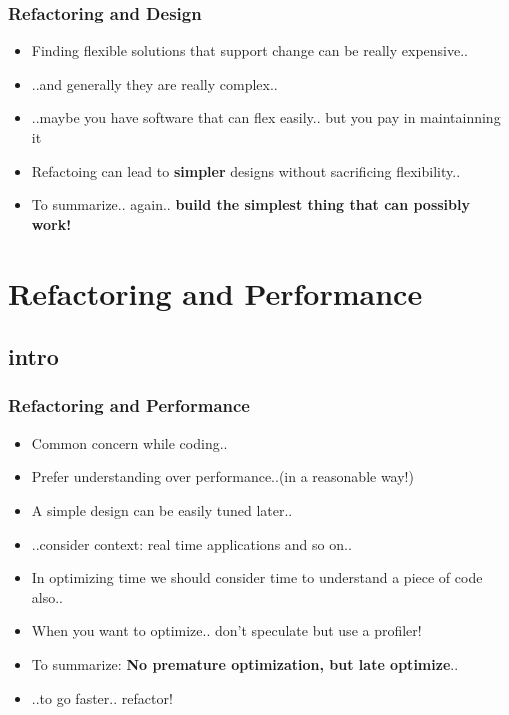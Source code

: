 \documentclass{beamer}
\begin{document}
  \begin{frame}
  \frametitle{Refactoring and Design} 
  \begin{itemize}
  		\item<+-> Finding flexible solutions that support change can be really expensive.. 
  		\item<+-> ..and generally they are really complex..
  		\item<+-> ..maybe you have software that can flex easily.. but you pay in maintainning it 
  		\item<+-> Refactoing can lead to \textbf{simpler} designs without sacrificing flexibility..
  		\item<+-> To summarize.. again.. \textbf{build the simplest thing that can possibly work!}
  \end{itemize}
\end{frame}

\section{Refactoring and Performance}
\subsection{intro}
\begin{frame}
  \frametitle{Refactoring and Performance} 
  \begin{itemize}
  		\item<+-> Common concern while coding..
  		\item<+-> Prefer understanding over performance..(in a reasonable way!)
  		\item<+-> A simple design can be easily tuned later..
  		\item<+-> ..consider context: real time applications and so on..
  		\item<+-> In optimizing time we should consider time to understand a piece of code also..
  		\item<+-> When you want to optimize.. don't speculate but use a profiler!
  		\item<+-> To summarize: \textbf{No premature optimization, but late optimize}..
  		\item<+-> ..to go faster.. refactor!
  \end{itemize}
\end{frame}
\end{document}
